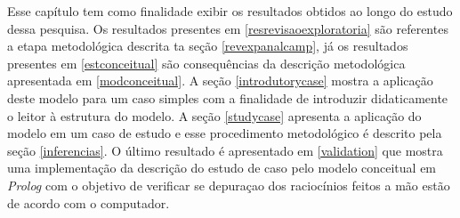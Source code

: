 Esse capítulo tem como finalidade exibir os resultados obtidos ao longo do estudo dessa pesquisa. Os resultados presentes em \ref{resrevisaoexploratoria} são referentes a etapa metodológica descrita ta seção \ref{revexpanalcamp}, já os resultados presentes em \ref{estconceitual} são consequências da descrição metodológica apresentada em \ref{modconceitual}. A seção \ref{introdutorycase} mostra a aplicação deste modelo para um caso simples com a finalidade de introduzir didaticamente o leitor à estrutura do modelo. A seção \ref{studycase} apresenta a aplicação do modelo em um caso de estudo e esse procedimento metodológico é descrito pela seção \ref{inferencias}. O último resultado é apresentado em \ref{validation} que mostra uma implementação da descrição do estudo de caso pelo modelo conceitual em \textit{Prolog} com o objetivo de verificar se depuraçao dos raciocínios feitos a mão estão de acordo com o computador.